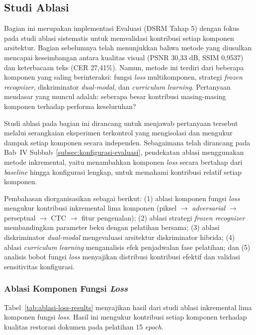 \documentclass[12pt,a4paper]{article}
\begin{document}


\subsection{Studi Ablasi}
\label{subsec:studi-ablasi}

Bagian ini merupakan implementasi Evaluasi (DSRM Tahap 5) dengan fokus pada studi ablasi sistematis untuk memvalidasi kontribusi setiap komponen arsitektur. Bagian sebelumnya telah menunjukkan bahwa metode yang diusulkan mencapai keseimbangan antara kualitas visual (PSNR 30,33 dB, SSIM 0,9537) dan keterbacaan teks (CER 27,41\%). Namun, metode ini terdiri dari beberapa komponen yang saling berinteraksi: fungsi \textit{loss} multikomponen, strategi \textit{frozen recognizer}, diskriminator \textit{dual-modal}, dan \textit{curriculum learning}. Pertanyaan mendasar yang muncul adalah: seberapa besar kontribusi masing-masing komponen terhadap performa keseluruhan?

Studi ablasi pada bagian ini dirancang untuk menjawab pertanyaan tersebut melalui serangkaian eksperimen terkontrol yang mengisolasi dan mengukur dampak setiap komponen secara independen. Sebagaimana telah dirancang pada Bab~IV Subbab~\ref{subsec:konfigurasi-evaluasi}, pendekatan ablasi menggunakan metode inkremental, yaitu menambahkan komponen \textit{loss} secara bertahap dari \textit{baseline} hingga konfigurasi lengkap, untuk memahami kontribusi relatif setiap komponen.

Pembahasan diorganisasikan sebagai berikut: (1) ablasi komponen fungsi \textit{loss} mengukur kontribusi inkremental lima komponen (piksel $\rightarrow$ \textit{adversarial} $\rightarrow$ perseptual $\rightarrow$ CTC $\rightarrow$ fitur pengenalan); (2) ablasi strategi \textit{frozen recognizer} membandingkan parameter beku dengan pelatihan bersama; (3) ablasi diskriminator \textit{dual-modal} mengevaluasi arsitektur diskriminator hibrida; (4) ablasi \textit{curriculum learning} menganalisis efek penjadwalan fase pelatihan; dan (5) analisis bobot fungsi \textit{loss} menyajikan distribusi kontribusi efektif dan validasi sensitivitas konfigurasi.

\subsubsection{Ablasi Komponen Fungsi \textit{Loss}}
\label{subsubsec:hasil-ablasi-loss}

Tabel~\ref{tab:ablasi-loss-results} menyajikan hasil dari studi ablasi inkremental lima komponen fungsi \textit{loss}. Hasil ini mengukur kontribusi setiap komponen terhadap kualitas restorasi dokumen pada pelatihan 15 \textit{epoch}.
\end{document}
